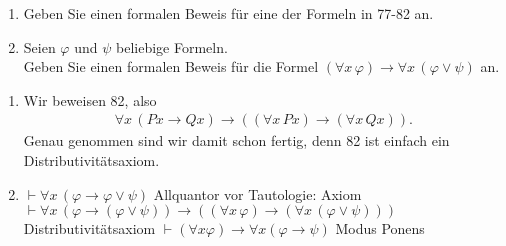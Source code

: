 
\begin{exercise}[94]

\phantom{}

\begin{enumerate}[label = \alph*)]
  \item Geben Sie einen formalen Beweis für eine der Formeln in 77-82 an.
  \item Seien $\varphi$ und $\psi$ beliebige Formeln. \\
  Geben Sie einen formalen Beweis für die Formel $(\forall x\, \varphi) \rightarrow
  \forall x \, (\varphi \lor \psi)$
  an.
\end{enumerate}

\end{exercise}


\begin{solution}

\phantom{}

\begin{enumerate}
  \item Wir beweisen 82, also
  \begin{align*}
    \forall x\, (Px \rightarrow Qx) \rightarrow ((\forall x\, Px) \rightarrow (\forall x\, Qx)).
  \end{align*}
  Genau genommen sind wir damit schon fertig, denn 82 ist einfach ein Distributivitätsaxiom.
  \item
  \begin{algorithmic}[1]
    \State $\vdash \forall x\, (\varphi \rightarrow \varphi \lor \psi)$
    \Comment Allquantor vor Tautologie: Axiom
    \State $\vdash \forall x\, (\varphi \rightarrow (\varphi \lor \psi))
    \rightarrow ((\forall x\, \varphi) \rightarrow (\forall x\, (\varphi \lor \psi)))$
    \Comment Distributivitätsaxiom
    \State $\vdash (\forall x \varphi) \rightarrow \forall x (\varphi \rightarrow \psi)$
    \Comment Modus Ponens
  \end{algorithmic}
\end{enumerate}

\end{solution}

